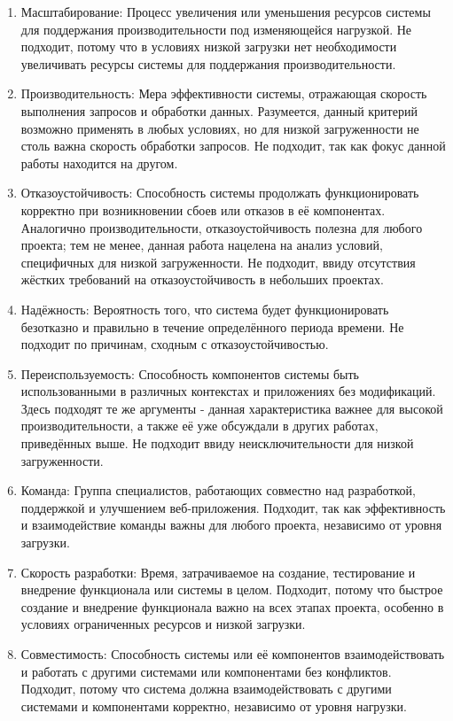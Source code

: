     \begin{enumerate}
        \item Масштабирование: Процесс увеличения или уменьшения ресурсов системы для поддержания производительности под изменяющейся нагрузкой. Не подходит, потому что в условиях низкой загрузки нет необходимости увеличивать ресурсы системы для поддержания производительности.
        \item Производительность: Мера эффективности системы, отражающая скорость выполнения запросов и обработки данных. Разумеется, данный критерий возможно применять в любых условиях, но для низкой загруженности не столь важна скорость обработки запросов. Не подходит, так как фокус данной работы находится на другом.
        \item Отказоустойчивость: Способность системы продолжать функционировать корректно при возникновении сбоев или отказов в её компонентах. Аналогично производительности, отказоустойчивость полезна для любого проекта; тем не менее, данная работа нацелена на анализ условий, специфичных для низкой загруженности. Не подходит, ввиду отсутствия жёстких требований на отказоустойчивость в небольших проектах.
        \item Надёжность: Вероятность того, что система будет функционировать безотказно и правильно в течение определённого периода времени. Не подходит по причинам, сходным с отказоустойчивостью.
        \item Переиспользуемость: Способность компонентов системы быть использованными в различных контекстах и приложениях без модификаций. Здесь подходят те же аргументы - данная характеристика важнее для высокой производительности, а также её уже обсуждали в других работах, приведённых выше. Не подходит ввиду неисключительности для низкой загруженности.
        \item Команда: Группа специалистов, работающих совместно над разработкой, поддержкой и улучшением веб-приложения. Подходит, так как эффективность и взаимодействие команды важны для любого проекта, независимо от уровня загрузки.
        \item Скорость разработки: Время, затрачиваемое на создание, тестирование и внедрение функционала или системы в целом. Подходит, потому что быстрое создание и внедрение функционала важно на всех этапах проекта, особенно в условиях ограниченных ресурсов и низкой загрузки.
        \item Совместимость: Способность системы или её компонентов взаимодействовать и работать с другими системами или компонентами без конфликтов. Подходит, потому что система должна взаимодействовать с другими системами и компонентами корректно, независимо от уровня нагрузки.

\end{enumerate}
